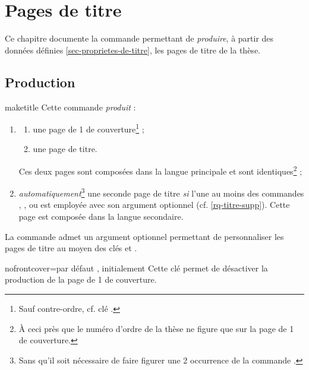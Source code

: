 \chapter{Pages de titre}\label{cha-pages-de-titre}

Ce chapitre documente la commande  permettant de
\emph{produire}, à partir des données définies \vref{sec-proprietes-de-titre},
les pages de titre de la thèse.

\section{Production}

\begin{docCommand}[doc description=\mandatory]{maketitle}{}%
  Cette commande \emph{produit} :
  \begin{enumerate}
  \item
    \begin{enumerate}
    \item une page de 1\iere{} de couverture\footnote{Sauf contre-ordre,
        cf. clé .} ;
    \item une page de titre.
    \end{enumerate}
    Ces deux pages sont composées dans la langue principale et
    sont identiques\footnote{À ceci près que le numéro d'ordre de la thèse ne figure
      que sur la page de 1\iere{} de couverture.} ;
  \item \emph{automatiquement}\footnote{Sans qu'il soit nécessaire de faire
      figurer une 2\ieme{} occurrence de la commande .} une
    seconde page de titre \emph{si}  l'une au moins des
    commandes , ,  ou
     est employée avec son argument optionnel
    (cf. \vref{rq-titre-supp}). Cette page est composée dans la langue
    secondaire.
  \end{enumerate}
\end{docCommand}

La commande  admet un argument optionnel permettant de
personnaliser les pages de titre au moyen des clés  et
.%
%
%

\begin{docKey}{nofrontcover}{=\textbar{}}{par défaut
    , initialement }%
  Cette clé permet de désactiver la production de la page de 1\iere{} de
  couverture.
\end{docKey}

